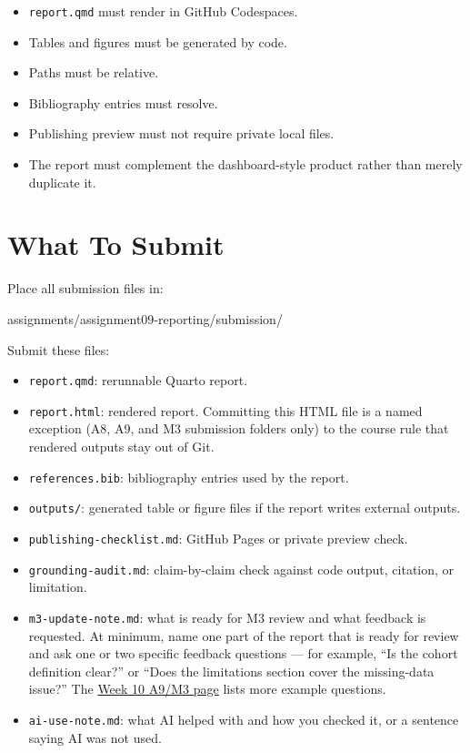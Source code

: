 \documentclass[
  letterpaper,
  DIV=11,
  numbers=noendperiod,
  oneside]{scrreprt}
\newenvironment{Shaded}{\begin{snugshade}}{\end{snugshade}}
\newcommand{\NormalTok}[1]{\textcolor[rgb]{0.00,0.23,0.31}{#1}}
\providecommand{\tightlist}{%
  \setlength{\itemsep}{0pt}\setlength{\parskip}{0pt}}
\begin{document}
\begin{itemize}
\tightlist
\item
  \texttt{report.qmd} must render in GitHub Codespaces.
\item
  Tables and figures must be generated by code.
\item
  Paths must be relative.
\item
  Bibliography entries must resolve.
\item
  Publishing preview must not require private local files.
\item
  The report must complement the dashboard-style product rather than
  merely duplicate it.
\end{itemize}

\section{What To Submit}\label{what-to-submit-8}

Place all submission files in:

\begin{Shaded}
\begin{Highlighting}[numbers=left,,]
\NormalTok{assignments/assignment09{-}reporting/submission/}
\end{Highlighting}
\end{Shaded}

Submit these files:

\begin{itemize}
\tightlist
\item
  \texttt{report.qmd}: rerunnable Quarto report.
\item
  \texttt{report.html}: rendered report. Committing this HTML file is a
  named exception (A8, A9, and M3 submission folders only) to the course
  rule that rendered outputs stay out of Git.
\item
  \texttt{references.bib}: bibliography entries used by the report.
\item
  \texttt{outputs/}: generated table or figure files if the report
  writes external outputs.
\item
  \texttt{publishing-checklist.md}: GitHub Pages or private preview
  check.
\item
  \texttt{grounding-audit.md}: claim-by-claim check against code output,
  citation, or limitation.
\item
  \texttt{m3-update-note.md}: what is ready for M3 review and what
  feedback is requested. At minimum, name one part of the report that is
  ready for review and ask one or two specific feedback questions ---
  for example, ``Is the cohort definition clear?'' or ``Does the
  limitations section cover the missing-data issue?'' The
  \hyperref[assignment-9-and-m3]{Week 10 A9/M3 page} lists more example
  questions.
\item
  \texttt{ai-use-note.md}: what AI helped with and how you checked it,
  or a sentence saying AI was not used.
\end{itemize}
\end{document}
